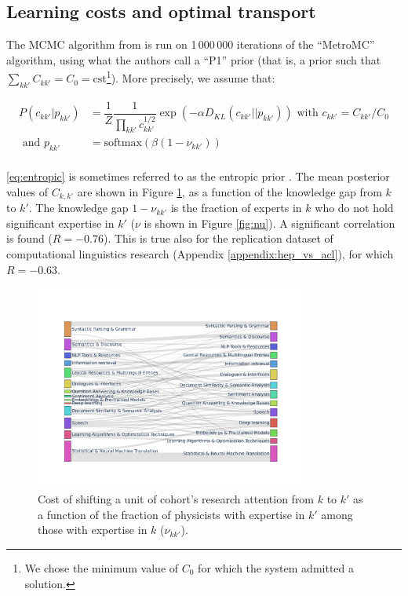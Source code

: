 \documentclass{article}
\begin{document}


\subsection{\label{appendix:optimal_transport}Learning costs and optimal transport}

The MCMC algorithm from \citealt{pmlr-v162-chiu22b} is run on 1\,000\,000 iterations of the ``MetroMC'' algorithm, using what the authors call a ``P1'' prior (that is, a prior such that $\sum_{kk'}C_{kk'}=C_0=\mathrm{cst}$\footnote{We chose the minimum value of $C_0$ for which the system admitted a solution.}). More precisely, we assume that:

\begin{align}
    P(c_{kk'}|p_{kk'}) &= \dfrac{1}{Z}\dfrac{1}{\displaystyle\prod_{kk'} c_{kk'}^{1/2}} \exp{\left(-\alpha D_{KL}(c_{kk'}||p_{kk'})\right)} \text{ with } c_{kk'} = C_{kk'}/C_0\label{eq:entropic}\\
    \text{ and } p_{kk'} &= \mathrm{softmax}(\beta (1-\nu_{kk'}))\\
\end{align}

\eqref{eq:entropic} is sometimes referred to as the entropic prior \citep{skilling1991bayesian,MacKay1995}. The mean posterior values of $C_{k,k'}$ are shown in Figure \ref{fig:cost_knowledge}, as a function of the knowledge gap from $k$ to $k'$. The knowledge gap  $1-\nu_{kk'}$ is the fraction of experts in $k$ who do not hold significant expertise in $k'$ ($\nu$ is shown in Figure \ref{fig:nu}).  A significant correlation is found ($R=-0.76$). This is true also for the replication dataset of computational linguistics research (Appendix \ref{appendix:hep_vs_acl}), for which $R=-0.63$.

\begin{figure}[H]
    \centering
    \includegraphics[width=0.8\textwidth]{Fig17}
    \caption{Cost of shifting a unit of cohort's research attention from $k$ to $k'$ as a function of the fraction of physicists with expertise in $k'$ among those with expertise in $k$ ($\nu_{kk'}$).}
    \label{fig:cost_knowledge}
\end{figure}
\end{document}
